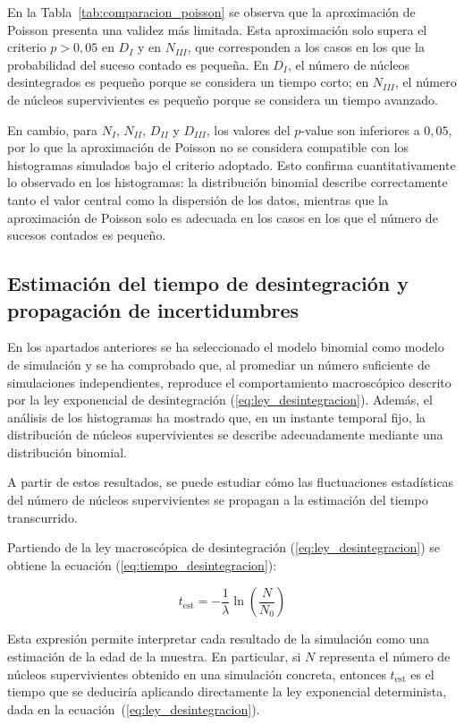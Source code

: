 \documentclass[12pt,a4paper]{article}
\begin{document}
En la Tabla~\ref{tab:comparacion_poisson} se observa que la aproximación de Poisson presenta una validez más limitada. Esta aproximación solo supera el criterio $p>0{,}05$ en $D_I$ y en $N_{III}$, que corresponden a los casos en los que la probabilidad del suceso contado es pequeña. En $D_I$, el número de núcleos desintegrados es pequeño porque se considera un tiempo corto; en $N_{III}$, el número de núcleos supervivientes es pequeño porque se considera un tiempo avanzado.

En cambio, para $N_I$, $N_{II}$, $D_{II}$ y $D_{III}$, los valores del $p$-value son inferiores a $0{,}05$, por lo que la aproximación de Poisson no se considera compatible con los histogramas simulados bajo el criterio adoptado. Esto confirma cuantitativamente lo observado en los histogramas: la distribución binomial describe correctamente tanto el valor central como la dispersión de los datos, mientras que la aproximación de Poisson solo es adecuada en los casos en los que el número de sucesos contados es pequeño.

\subsection{Estimación del tiempo de desintegración y propagación de incertidumbres}
\label{sec:estimacion_tiempo_desintegracion}

En los apartados anteriores se ha seleccionado el modelo binomial como modelo de simulación y se ha comprobado que, al promediar un número suficiente de simulaciones independientes, reproduce el comportamiento macroscópico descrito por la ley exponencial de desintegración (\ref{eq:ley_desintegracion}). Además, el análisis de los histogramas ha mostrado que, en un instante temporal fijo, la distribución de núcleos supervivientes se describe adecuadamente mediante una distribución binomial. 

A partir de estos resultados, se puede estudiar cómo las fluctuaciones estadísticas del número de núcleos supervivientes se propagan a la estimación del tiempo transcurrido.

Partiendo de la ley macroscópica de desintegración (\ref{eq:ley_desintegracion}) se obtiene la ecuación (\ref{eq:tiempo_desintegracion}):

\begin{equation}
t_{\mathrm{est}}=
-\frac{1}{\lambda}
\ln\left(\frac{N}{N_0}\right)
\label{eq:tiempo_estimado}
\end{equation}

Esta expresión permite interpretar cada resultado de la simulación como una estimación de la edad de la muestra. En particular, si $N$ representa el número de núcleos supervivientes obtenido en una simulación concreta, entonces $t_{\mathrm{est}}$ es el tiempo que se deduciría aplicando directamente la ley exponencial determinista, dada en la ecuación~(\ref{eq:ley_desintegracion}).
\end{document}
